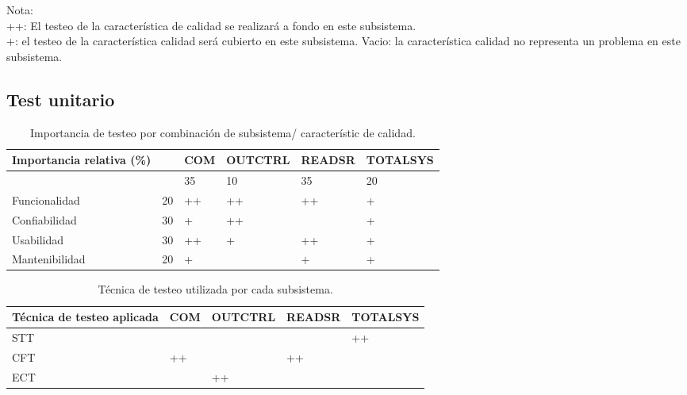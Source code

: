 \documentclass[12pt,a4paper, twosite]{article}
\begin{document}
Nota:\\
++: El testeo de la característica de calidad se realizará a fondo en este
subsistema.\\
+: el testeo de la característica calidad será cubierto en este subsistema.
Vacio: la característica calidad no representa un problema en este subsistema.
\\

\subsection{Test unitario}

\begin{table}[ht]
    \centering
    \begin{tabular}{|l|l|l|l|l|l|}\hline \hline
        Importancia relativa (\%) &    & COM & OUTCTRL & READSR & TOTALSYS \\
        \hline

                                  &    & 35  & 10      & 35     & 20       \\
        Funcionalidad             & 20 & ++  & ++      & ++     & +        \\
        Confiabilidad             & 30 & +   & ++      &        & +        \\
        Usabilidad                & 30 & ++  & +       & ++     & +        \\
        Mantenibilidad            & 20 & +   &         & +      & +        \\
        \hline
    \end{tabular}
    \caption{Importancia de testeo por combinación de subsistema/ característic
        de calidad.}
\end{table}

\begin{table}[ht]
    \centering
    \begin{tabular}{|l|l|l|l|l|}\hline \hline
        Técnica de testeo aplicada & COM & OUTCTRL & READSR & TOTALSYS \\
        \hline
        STT                        &     &         &        & ++       \\
        CFT                        & ++  &         & ++     &          \\
        ECT                        &     & ++      &        &          \\
        \hline
    \end{tabular}
    \caption{Técnica de testeo utilizada por cada subsistema.}
\end{table}
\end{document}
